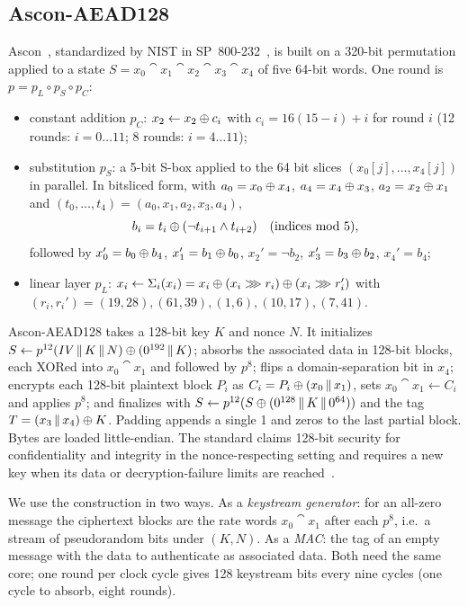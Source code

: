 \subsection{Ascon-AEAD128}\label{sec:ascon}
Ascon~\cite{ascon}, standardized by NIST in SP~800-232~\cite{sp800232}, is built on a 320-bit permutation applied to a state $S = x_0 \cat x_1 \cat x_2 \cat x_3 \cat x_4$ of five 64-bit words. One round is $p = p_L \circ p_S \circ p_C$:
\begin{itemize}
\item constant addition $p_C$: $x_2 \leftarrow x_2 \oplus c_i$ with $c_i = 16(15 - i) + i$ for round $i$ (12 rounds: $i = 0 \ldots 11$; 8 rounds: $i = 4 \ldots 11$);
\item substitution $p_S$: a 5-bit S-box applied to the 64 bit slices $(x_0[j], \ldots, x_4[j])$ in parallel. In bitsliced form, with $a_0 = x_0 \oplus x_4$, $a_4 = x_4 \oplus x_3$, $a_2 = x_2 \oplus x_1$ and $(t_0, \ldots, t_4) = (a_0, x_1, a_2, x_3, a_4)$,
\begin{equation}
b_i = t_i \oplus (\neg t_{i+1} \wedge t_{i+2}) \quad (\text{indices mod } 5),
\label{eq:chi}
\end{equation}
followed by $x_0' = b_0 \oplus b_4$, $x_1' = b_1 \oplus b_0$, $x_2' = \neg b_2$, $x_3' = b_3 \oplus b_2$, $x_4' = b_4$;
\item linear layer $p_L$: $x_i \leftarrow \Sigma_i(x_i) = x_i \oplus (x_i \ggg r_i) \oplus (x_i \ggg r_i')$ with $(r_i, r_i') = (19, 28), (61, 39), (1, 6), (10, 17), (7, 41)$.
\end{itemize}
Ascon-AEAD128 takes a 128-bit key $K$ and nonce $N$. It initializes $S \leftarrow p^{12}(\mathit{IV} \,\|\, K \,\|\, N) \oplus (0^{192} \,\|\, K)$; absorbs the associated data in 128-bit blocks, each XORed into $x_0 \cat x_1$ and followed by $p^8$; flips a domain-separation bit in $x_4$; encrypts each 128-bit plaintext block $P_i$ as $C_i = P_i \oplus (x_0 \,\|\, x_1)$, sets $x_0 \cat x_1 \leftarrow C_i$ and applies $p^8$; and finalizes with $S \leftarrow p^{12}(S \oplus (0^{128} \,\|\, K \,\|\, 0^{64}))$ and the tag $T = (x_3 \,\|\, x_4) \oplus K$. Padding appends a single 1 and zeros to the last partial block. Bytes are loaded little-endian. The standard claims 128-bit security for confidentiality and integrity in the nonce-respecting setting and requires a new key when its data or decryption-failure limits are reached~\cite{sp800232}.

We use the construction in two ways. As a \emph{keystream generator}: for an all-zero message the ciphertext blocks are the rate words $x_0 \cat x_1$ after each $p^8$, i.e.\ a stream of pseudorandom bits under $(K, N)$. As a \emph{MAC}: the tag of an empty message with the data to authenticate as associated data. Both need the same core; one round per clock cycle gives 128 keystream bits every nine cycles (one cycle to absorb, eight rounds).


